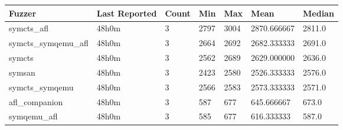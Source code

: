 
\begin{table*}[h]
\centering
\begin{tabular}{|l|l|l|l|l|l|l|}
\hline
\textbf{Fuzzer} & \textbf{Last Reported} & \textbf{Count} & \textbf{Min} & \textbf{Max} & \textbf{Mean} & \textbf{Median} \\
\hline
symcts\_afl        & 48h0m              & 3      & 2797  & 3004  & 2870.666667   & 2811.0     \\
symcts\_symqemu\_afl & 48h0m              & 3      & 2664  & 2692  & 2682.333333   & 2691.0     \\
symcts             & 48h0m              & 3      & 2562  & 2689  & 2629.000000   & 2636.0     \\
symsan             & 48h0m              & 3      & 2423  & 2580  & 2526.333333   & 2576.0     \\
symcts\_symqemu    & 48h0m              & 3      & 2566  & 2583  & 2573.333333   & 2571.0     \\
afl\_companion     & 48h0m              & 3      & 587   & 677   & 645.666667    & 673.0      \\
symqemu\_afl       & 48h0m              & 3      & 585   & 677   & 616.333333    & 587.0      \\
\hline
\end{tabular}
\end{table*}